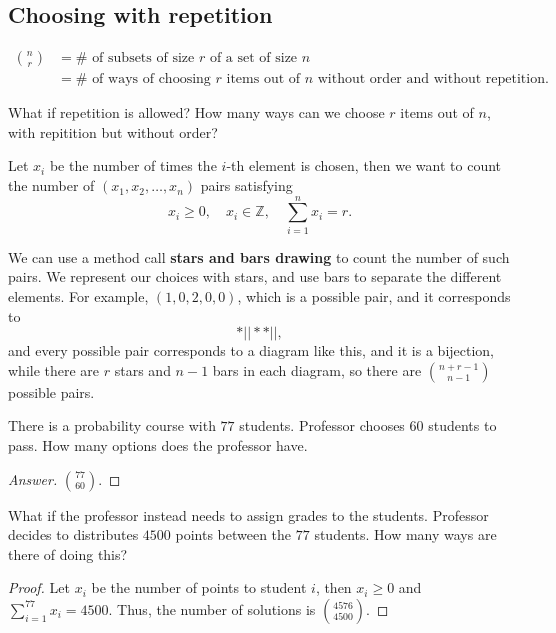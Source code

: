 \subsection{Choosing with repetition}
\begin{prev}
    \begin{align*}
        \binom{n}{r} &= \# \text{ of subsets of size } r \text{ of a set of size }n \\
        &= \# \text{ of ways of choosing } r \text{ items out of } n \text{ without order and without repetition}.     
    \end{align*}
\end{prev}

\begin{question}
    What if repetition is allowed? How many ways can we choose \(r\) items out of \(n\), with repitition but without order?  
\end{question}

Let \(x_i\) be the number of times the \(i\)-th element is chosen, then we want to count the number of \((x_1, x_2, \dots , x_n)\) pairs satisfying 
\[
    x_i \ge 0, \quad x_i \in \mathbb{Z}, \quad \sum_{i=1}^n x_i = r. 
\]   

We can use a method call \textbf{stars and bars drawing} to count the number of such pairs. We represent our choices with stars, and use bars to separate the different elements. For example, \((1,0,2,0,0)\), which is a possible pair, and it corresponds to 
\[
    * || ** | |,
\]   
and every possible pair corresponds to a diagram like this, and it is a bijection, while there are \(r\) stars and \(n - 1\) bars in each diagram, so there are \(\binom{n + r - 1}{n - 1}\) possible pairs.

\begin{eg}
    There is a probability course with \(77\) students. Professor chooses \(60\) students to pass. How many options does the professor have.  
\end{eg}
\begin{proof}[Answer]
    \(\binom{77}{60}\). 
\end{proof}

\begin{eg}
    What if the professor instead needs to assign grades to the students. Professor decides to distributes \(4500\) points between the \(77\) students. How many ways are there of doing this?  
\end{eg}
\begin{proof}
    Let \(x_i\) be the number of points to student \(i\), then \(x_i \ge 0\) and \(\sum_{i=1}^{77} x_i = 4500 \). Thus, the number of solutions is \(\binom{4576}{4500}\).     
\end{proof}

